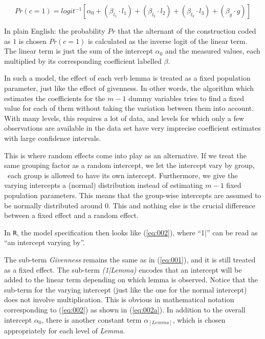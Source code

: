 \begin{equation}
  Pr(c=1)=logit^{-1}\left[\alpha_0+(\beta_{l_1}\cdot l_1)+(\beta_{l_2}\cdot l_2)+(\beta_{l_3}\cdot l_3)+(\beta_{g}\cdot g)\right]
  \label{eq:001a}
\end{equation}

In plain English: the probability $Pr$ that the alternant of the construction coded as $1$ is chosen $Pr(c=1)$ is calculated as the inverse logit of the linear term.
The linear term is just the sum of the intercept $\alpha_0$ and the measured values, each multiplied by its corresponding coefficient labelled $\beta$.

In such a model, the effect of each verb lemma is treated as a fixed population parameter, just like the effect of givenness.
In other words, the algorithm which estimates the coefficients for the $m-1$ dummy variables tries to find a fixed value for each of them without taking the variation between them into account.
With many levels, this requires a lot of data, and levels for which only a few observations are available in the data set have very imprecise coefficient estimates with large confidence intervals.

This is where random effects come into play as an alternative.
If we treat the same grouping factor as a random intercept, we let the intercept vary by group, \ie\ each group is allowed to have its own intercept.
Furthermore, we give the varying intercepts a (normal) distribution instead of estimating $m-1$ fixed population parameters.
This means that the group-wise intercepts are assumed to be normally distributed around $0$.
This and nothing else is the crucial difference between a fixed effect and a random effect.

In \texttt{R}, the model specification then looks like (\ref{eq:002}), where ``1|'' can be read as ``an intercept varying by''.


The sub-term \textit{Givenness} remains the same as in (\ref{eq:001}), and it is still treated as a fixed effect.
The sub-term \textit{(1|Lemma)} encodes that an intercept will be added to the linear term depending on which lemma is observed.
Notice that the sub-term for the varying intercept (just like the one for the normal intercept) does not involve multiplication.
This is obvious in mathematical notation corresponding to (\ref{eq:002}) as shown in (\ref{eq:002a}).
In addition to the overall intercept $\alpha_0$, there is another constant term $\alpha_{[Lemma]}$, which is chosen appropriately for each level of \textit{Lemma}.

